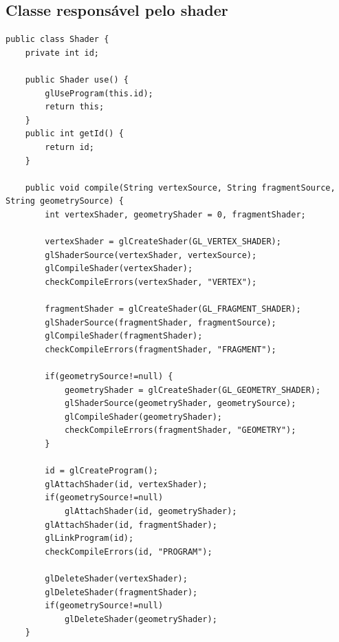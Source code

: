 \documentclass[12pt, 
openright, 
oneside, 
a4paper,    
brazil]{facom-ufu-abntex2}
\begin{document}




\begin{apendicesenv}


\chapter{Classe responsável pelo shader}
\label{apend:alg:classeShader}
 \begin{lstlisting}[caption=Classe responsável pelo Shader ]
public class Shader {
	private int id;
	
	public Shader use() {
		glUseProgram(this.id);
		return this;
	}
	public int getId() {
		return id;
	}

	public void compile(String vertexSource, String fragmentSource, String geometrySource) {
		int vertexShader, geometryShader = 0, fragmentShader;
		
		vertexShader = glCreateShader(GL_VERTEX_SHADER);
		glShaderSource(vertexShader, vertexSource);
		glCompileShader(vertexShader);
		checkCompileErrors(vertexShader, "VERTEX");
		
		fragmentShader = glCreateShader(GL_FRAGMENT_SHADER);
		glShaderSource(fragmentShader, fragmentSource);
		glCompileShader(fragmentShader);
		checkCompileErrors(fragmentShader, "FRAGMENT");
		
		if(geometrySource!=null) {
			geometryShader = glCreateShader(GL_GEOMETRY_SHADER);
			glShaderSource(geometryShader, geometrySource);
			glCompileShader(geometryShader);
			checkCompileErrors(fragmentShader, "GEOMETRY");
		}
		
		id = glCreateProgram();
		glAttachShader(id, vertexShader);
		if(geometrySource!=null)
			glAttachShader(id, geometryShader);
		glAttachShader(id, fragmentShader);
		glLinkProgram(id);
		checkCompileErrors(id, "PROGRAM");
		
		glDeleteShader(vertexShader);
		glDeleteShader(fragmentShader);
		if(geometrySource!=null)
			glDeleteShader(geometryShader);
	}
	

\end{lstlisting}
\end{apendicesenv}
\end{document}
